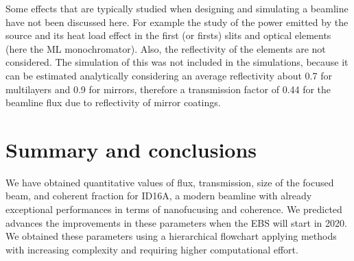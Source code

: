 \documentclass{iucr}              %
\newcommand{\todo}[1]{{\color{red}[TODO: "#1'']}}
\begin{document}
Some effects that are typically studied when designing and simulating a beamline have not been discussed here. For example the study of the power emitted by the source and its heat load effect in the first (or firsts) slits and optical elements (here the ML monochromator). Also, the reflectivity of the elements are not considered. The simulation of this was not included in the simulations, because it can be estimated analytically considering an average reflectivity about 0.7 for multilayers and 0.9 for mirrors, therefore a transmission factor of 0.44 for the beamline flux due to reflectivity of mirror coatings. 


\section{Summary and conclusions}
\label{summary}

We have obtained quantitative values of flux, transmission, size of the focused beam, and coherent fraction for ID16A, a modern beamline with already exceptional performances in terms of nanofucusing and coherence. We predicted advances the improvements in these parameters when the EBS will start in 2020. We obtained these parameters using a hierarchical flowchart applying methods with increasing complexity and requiring higher computational effort. 
\end{document}
